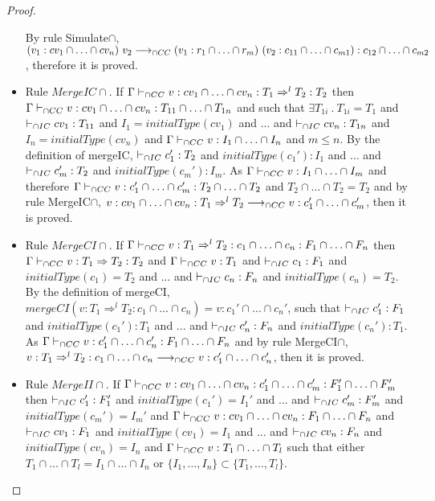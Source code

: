 \documentclass[a4paper]{article}
\begin{document}
\begin{proof}
\begin{itemize}
    By rule Simulate$\cap$, $(v_1 : cv_1 \cap \ldots \cap cv_n)\ v_2 \longrightarrow_{\cap CC}\\ (v_1 : r_1 \cap \ldots \cap r_m)\ (v_2 : c_{11} \cap \ldots \cap c_{m1}) : c_{12} \cap \ldots \cap c_{m2}$, therefore it is proved.
    \item Rule $MergeIC{\cap}$.
    If $\Gamma \vdash_{\cap CC} v : cv_1 \cap \ldots \cap cv_n : T_1 \Rightarrow^l T_2 : T_2$ then $\Gamma \vdash_{\cap CC} v : cv_1 \cap \ldots \cap cv_n : T_{11} \cap \ldots \cap T_{1n}$ and such that $\exists T_{1i}\ .\ T_{1i} = T_1$ and $\vdash_{\cap IC} cv_1 : T_{11}$ and $I_1 = initialType(cv_1)$ and ... and $\vdash_{\cap IC} cv_n : T_{1n}$ and $I_n = initialType(cv_n)$ and $\Gamma \vdash_{\cap CC} v : I_1 \cap \ldots \cap I_n$ and $m \leq n$.
    By the definition of mergeIC, $\vdash_{\cap IC} c_1' : T_2$ and $initialType(c_1') : I_1$ and ... and $\vdash_{\cap IC} c_m' : T_2$ and $initialType(c_m') : I_m$.
    As $\Gamma \vdash_{\cap CC} v : I_1 \cap \ldots \cap I_m$ and therefore $\Gamma \vdash_{\cap CC} v : c_1' \cap \ldots \cap c_m' : T_2 \cap \ldots \cap T_2$ and $T_2 \cap \ldots \cap T_2 = T_2$ and by rule MergeIC$\cap$, $v : cv_1 \cap \ldots \cap cv_n : T_1 \Rightarrow^l T_2 \longrightarrow_{\cap CC} v : c_1' \cap \ldots \cap c_m'$, then it is proved.
    \item Rule $MergeCI{\cap}$.
    If $\Gamma \vdash_{\cap CC} v : T_1 \Rightarrow^l T_2 : c_1 \cap \ldots \cap c_n : F_1 \cap \ldots \cap F_n$ then $\Gamma \vdash_{\cap CC} v : T_1 \Rightarrow T_2 : T_2$ and $\Gamma \vdash_{\cap CC} v : T_1$ and $\vdash_{\cap IC} c_1 : F_1$ and $initialType(c_1) = T_2$ and ... and $\vdash_{\cap IC} c_n : F_n$ and $initialType(c_n) = T_2$.
    By the definition of mergeCI, $mergeCI(v : T_1 \Rightarrow^l T_2 : c_1 \cap \ldots \cap c_n) = v : c_1' \cap \ldots \cap c_n'$, such that $\vdash_{\cap IC} c_1' : F_1$ and $initialType(c_1') : T_1$ and ... and $\vdash_{\cap IC} c_n' : F_n$ and $initialType(c_n') : T_1$.
    As $\Gamma \vdash_{\cap CC} v : c_1' \cap \ldots \cap c_n' : F_1 \cap \ldots \cap F_n$ and by rule MergeCI$\cap$, $v : T_1 \Rightarrow^l T_2 : c_1 \cap \ldots \cap c_n \longrightarrow_{\cap CC} v : c_1' \cap \ldots \cap c_n'$, then it is proved.
    \item Rule $MergeII{\cap}$.
    If $\Gamma \vdash_{\cap CC} v : cv_1 \cap \ldots \cap cv_n : c_1' \cap \ldots \cap c_m' : F_1' \cap \ldots \cap F_m'$ then $\vdash_{\cap IC} c_1' : F_1'$ and $initialType(c_1') = I_1'$ and ... and $\vdash_{\cap IC} c_m' : F_m'$ and $initialType(c_m') = I_m'$ and $\Gamma \vdash_{\cap CC} v : cv_1 \cap \ldots \cap cv_n : F_1 \cap \ldots \cap F_n$ and $\vdash_{\cap IC} cv_1 : F_1$ and $initialType(cv_1) = I_1$ and ... and $\vdash_{\cap IC} cv_n : F_n$ and $initialType(cv_n) = I_n$ and $\Gamma \vdash_{\cap CC} v : T_1 \cap \ldots \cap T_l$ such that either $T_1 \cap \ldots \cap T_l = I_1 \cap \ldots \cap I_n$ or $\{I_1, \ldots, I_n\} \subset \{T_1, \ldots, T_l\}$.

\end{itemize}
\end{proof}
\end{document}
